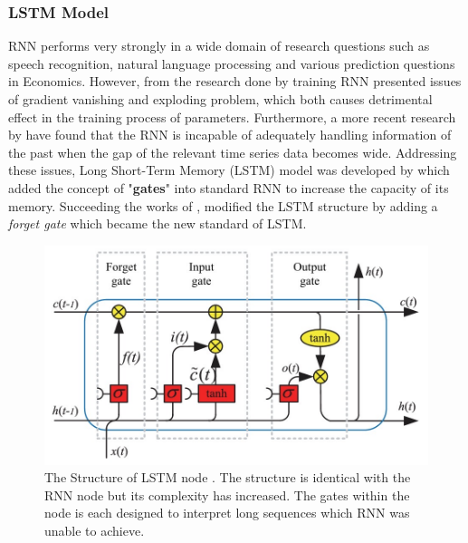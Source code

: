 \subsubsection{LSTM Model}
RNN performs very strongly in a wide domain of research questions such as speech recognition, natural language processing and various prediction questions in Economics. However, from the research done by \citet{RNN_problem} training RNN presented issues of gradient vanishing and exploding problem, which both causes detrimental effect in the training process of parameters. Furthermore, a more recent research by \citet{RNN_longtermdependency_issue} have found that the RNN is incapable of adequately handling information of the past when the gap of the relevant time series data becomes wide. Addressing these issues, Long Short-Term Memory (LSTM) model was developed by \citet{LSTM} which added the concept of "\textbf{gates}" into standard RNN to increase the capacity of its memory. Succeeding the works of \citet{LSTM}, \citet{LSTM_forget_gate} modified the LSTM structure by adding a \textit{forget gate} which became the new standard of LSTM. 

\begin{figure}[ht]
    \centering
    \includegraphics[width=12cm]{images/LSTM.png}
    \caption{The Structure of LSTM node \citep{LSTM_GRU_description}. The structure is identical with the RNN node but its complexity has increased. The gates within the node is each designed to interpret long sequences which RNN was unable to achieve.}
    \label{fig:LSTM}
\end{figure}


